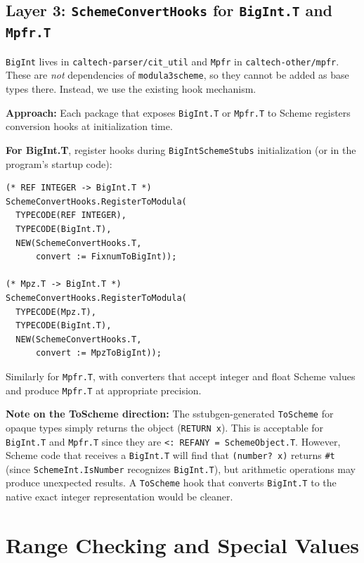 \documentclass[11pt]{article}
\begin{document}
\subsection{Layer 3: \texttt{SchemeConvertHooks} for \texttt{BigInt.T} and \texttt{Mpfr.T}}

\texttt{BigInt} lives in \texttt{caltech-parser/cit\_util} and
\texttt{Mpfr} in \texttt{caltech-other/mpfr}.  These are \emph{not}
dependencies of \texttt{modula3scheme}, so they cannot be added as base
types there.  Instead, we use the existing hook mechanism.

\textbf{Approach:} Each package that exposes \texttt{BigInt.T} or
\texttt{Mpfr.T} to Scheme registers conversion hooks at initialization
time.

\textbf{For BigInt.T}, register hooks during \texttt{BigIntSchemeStubs}
initialization (or in the program's startup code):

\begin{lstlisting}
(* REF INTEGER -> BigInt.T *)
SchemeConvertHooks.RegisterToModula(
  TYPECODE(REF INTEGER),
  TYPECODE(BigInt.T),
  NEW(SchemeConvertHooks.T,
      convert := FixnumToBigInt));

(* Mpz.T -> BigInt.T *)
SchemeConvertHooks.RegisterToModula(
  TYPECODE(Mpz.T),
  TYPECODE(BigInt.T),
  NEW(SchemeConvertHooks.T,
      convert := MpzToBigInt));
\end{lstlisting}

Similarly for \texttt{Mpfr.T}, with converters that accept integer and
float Scheme values and produce \texttt{Mpfr.T} at appropriate
precision.

\textbf{Note on the ToScheme direction:} The sstubgen-generated
\texttt{ToScheme} for opaque types simply returns the object
(\texttt{RETURN x}).  This is acceptable for \texttt{BigInt.T} and
\texttt{Mpfr.T} since they are \texttt{<: REFANY = SchemeObject.T}.
However, Scheme code that receives a \texttt{BigInt.T} will find that
\texttt{(number? x)} returns \texttt{\#t} (since
\texttt{SchemeInt.IsNumber} recognizes \texttt{BigInt.T}), but
arithmetic operations may produce unexpected results.  A
\texttt{ToScheme} hook that converts \texttt{BigInt.T} to the native
exact integer representation would be cleaner.

\section{Range Checking and Special Values}
\end{document}
